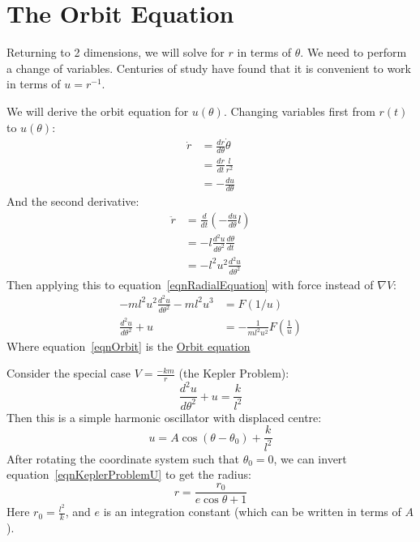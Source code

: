 \documentclass[../Main.tex]{subfiles}
\begin{document}
\section{The Orbit Equation}
Returning to 2 dimensions, we will solve for $r$ in terms of $\theta$. We need to perform a change of variables. Centuries of study have found that it is convenient to work in terms of $u = r^{-1}$.\par
We will derive the orbit equation for $u(\theta)$. Changing variables first from $r(t)$ to $u(\theta)$:
\begin{align*}
    \dot{r} &= \frac{dr}{d\theta} \dot{\theta} \\
    &= \frac{dr}{dt}\frac{l}{r^2}\\
    &= -\frac{du}{d\theta}
\end{align*}
And the second derivative:
\begin{align*}
    \ddot{r} &= \frac{d}{dt}\left(-\frac{du}{d\theta}l\right) \\
    &= -l\frac{d^2u}{d\theta^2}\frac{d\theta}{dt} \\
    &= -l^2 u^2 \frac{d^2u}{d\theta^2}
\end{align*}
Then applying this to equation~\ref{eqnRadialEquation} with force instead of $\nabla V$:
\begin{align}
    -ml^2 u^2 \frac{d^2u}{d\theta^2} - ml^2 u^3 &= F\left(1/u\right) \nonumber \\
    \frac{d^2u}{d\theta^2} + u &= -\frac{1}{ml^2u^2} F\left(\frac{1}{u}\right) \label{eqnOrbit}
\end{align}
Where equation~\ref{eqnOrbit} is the \underline{Orbit equation}\par
Consider the special case $V = \frac{-km}{r}$ (the Kepler Problem):
\begin{equation*}
    \frac{d^2u}{d\theta^2} + u = \frac{k}{l^2}
\end{equation*}
Then this is a simple harmonic oscillator with displaced centre:
\begin{equation}
    u = A \cos{(\theta - \theta_0)} + \frac{k}{l^2}
    \label{eqnKeplerProblemU}
\end{equation}
After rotating the coordinate system such that $\theta_0 = 0$, we can invert equation~\ref{eqnKeplerProblemU} to get the radius:
\begin{equation}
    r = \frac{r_0}{e\cos{\theta} + 1}
    \label{eqnKeplerProblemR}
\end{equation}
Here $r_0 = \frac{l^2}{k}$, and $e$ is an integration constant (which can be written in terms of $A$).\par
\end{document}
